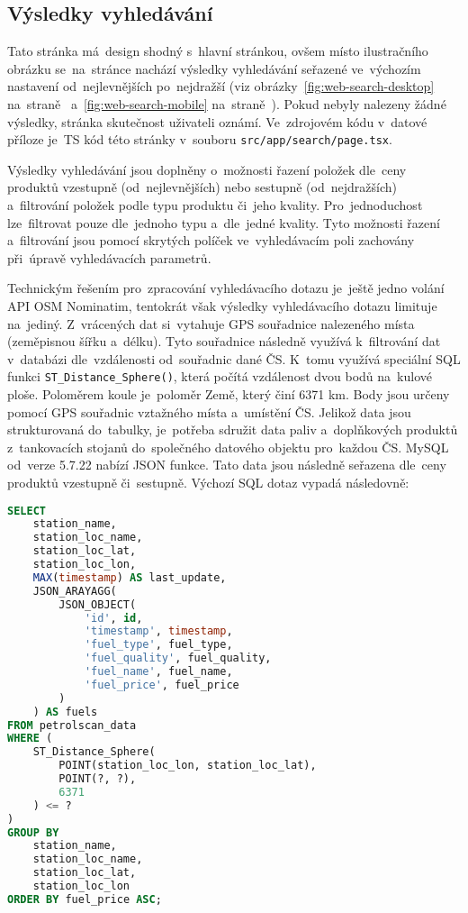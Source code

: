 \subsection{Výsledky vyhledávání}
\label{sec:search-results}

Tato stránka má~design shodný s~hlavní stránkou, ovšem místo ilustračního
obrázku se~na~stránce nachází výsledky vyhledávání seřazené ve~výchozím
nastavení od~nejlevnějších po~nejdražší
(viz obrázky~\ref{fig:web-search-desktop}
na~straně~\pageref{fig:web-search-desktop}
a~\ref{fig:web-search-mobile} na~straně~\pageref{fig:web-search-mobile}).
Pokud nebyly nalezeny žádné výsledky, stránka skutečnost uživateli
oznámí. Ve~zdrojovém kódu v~datové příloze je~TS kód této stránky v~souboru
\texttt{src/app/search/page.tsx}.

Výsledky vyhledávání jsou doplněny o~možnosti řazení položek dle~ceny produktů
vzestupně (od~nejlevnějších) nebo sestupně (od~nejdražších) a~filtrování
položek podle typu produktu či~jeho kvality. Pro~jednoduchost lze~filtrovat
pouze dle~jednoho typu a~dle~jedné kvality. Tyto možnosti řazení a~filtrování
jsou pomocí skrytých políček ve~vyhledávacím poli zachovány při~úpravě
vyhledávacích parametrů.

Technickým řešením pro~zpracování vyhledávacího dotazu je~ještě jedno volání
API OSM Nominatim, tentokrát však výsledky vyhledávacího dotazu limituje
na~jediný. Z~vrácených dat si~vytahuje GPS souřadnice nalezeného místa
(zeměpisnou šířku a~délku). Tyto souřadnice následně využívá k~filtrování
dat v~databázi dle~vzdálenosti od~souřadnic dané ČS. K~tomu využívá speciální
SQL funkci \texttt{ST\_Distance\_Sphere()}, která počítá vzdálenost dvou bodů
na~kulové ploše. Poloměrem koule je~poloměr Země, který činí 6371 km.
Body jsou určeny pomocí GPS souřadnic vztažného místa a~umístění ČS. Jelikož
data jsou strukturovaná do~tabulky, je~potřeba sdružit data paliv a~doplňkových
produktů z~tankovacích stojanů do~společného datového objektu pro~každou ČS.
MySQL od~verze 5.7.22 nabízí JSON funkce. Tato data jsou následně seřazena
dle~ceny produktů vzestupně či~sestupně. Výchozí SQL dotaz vypadá následovně:

\begin{lstlisting}[label=lst:default-sql-query,caption={SQL dotaz srovnávače cen},language=sql]
SELECT
    station_name,
    station_loc_name,
    station_loc_lat,
    station_loc_lon,
    MAX(timestamp) AS last_update,
    JSON_ARAYAGG(
        JSON_OBJECT(
            'id', id,
            'timestamp', timestamp,
            'fuel_type', fuel_type,
            'fuel_quality', fuel_quality,
            'fuel_name', fuel_name,
            'fuel_price', fuel_price
        )
    ) AS fuels
FROM petrolscan_data
WHERE (
    ST_Distance_Sphere(
        POINT(station_loc_lon, station_loc_lat),
        POINT(?, ?),
        6371
    ) <= ?
)
GROUP BY
    station_name,
    station_loc_name,
    station_loc_lat,
    station_loc_lon
ORDER BY fuel_price ASC;
\end{lstlisting}

